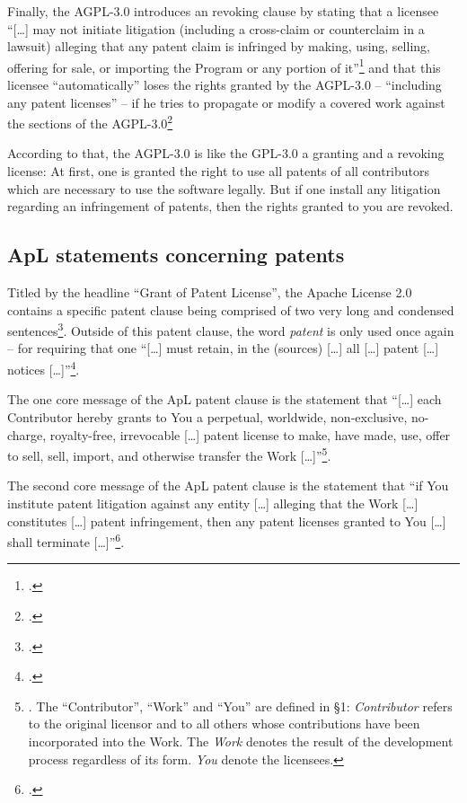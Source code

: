 Finally, the AGPL-3.0 introduces an revoking clause by stating that a licensee
\enquote{[\ldots] may not initiate litigation (including a cross-claim or
counterclaim in a lawsuit) alleging that any patent claim is infringed by
making, using, selling, offering for sale, or importing the Program or any
portion of it}\footcite[cf.][\nopage §10]{Agpl30OsiLicense2007a} and that this
licensee \enquote{automatically} loses the rights granted by the AGPL-3.0 --
\enquote{including any patent licenses} -- if he tries to propagate or modify a
covered work against the sections of the AGPL-3.0\footcite[cf.][\nopage
§8]{Agpl30OsiLicense2007a}

According to that, the AGPL-3.0 is like the GPL-3.0 a granting and a revoking
license: At first, one is granted the right to use all patents of all
contributors which are necessary to use the software legally. But if one install
any litigation regarding an infringement of patents, then the rights granted to
you are revoked.


\subsection{ApL statements concerning patents}\label{subsec:ApLPatentClause}

Titled by the headline \enquote{Grant of Patent License}, the Apache License 2.0
contains a specific patent clause being comprised of two very long and condensed
sentences\footcite[cf.][\nopage wp §3]{Apl20OsiLicense2004a}. Outside of this
patent clause, the word \emph{patent} is only used once again -- for requiring
that one \enquote{[\ldots] must retain, in the (sources) [\ldots] all [\ldots]
patent [\ldots] notices [\ldots]}\footcite[cf.][\nopage wp
§4.3]{Apl20OsiLicense2004a}.

The one core message of the ApL patent clause is the statement that
\enquote{[\ldots] each Contributor hereby grants to You a perpetual, worldwide,
non-exclusive, no-charge, royalty-free, irrevocable [\ldots] patent license to
make, have made, use, offer to sell, sell, import, and otherwise transfer the
Work [\ldots]}\footnote{\cite[cf.][\nopage wp §3]{Apl20OsiLicense2004a}. The \enquote{Contributor},
\enquote{Work} and \enquote{You} are defined in §1: \emph{Contributor} refers to
the original licensor and to all others whose contributions have been
incorporated into the Work. The \emph{Work} denotes the result of the
development process regardless of its form. \emph{You} denote the
licensees.}.

The second core message of the ApL patent clause is the statement that
\enquote{if You institute patent litigation against any entity [\ldots] alleging
that the Work [\ldots] constitutes [\ldots] patent infringement, then any patent
licenses granted to You [\ldots] shall terminate [\ldots]}\footcite[cf.][\nopage
wp §3]{Apl20OsiLicense2004a}.

